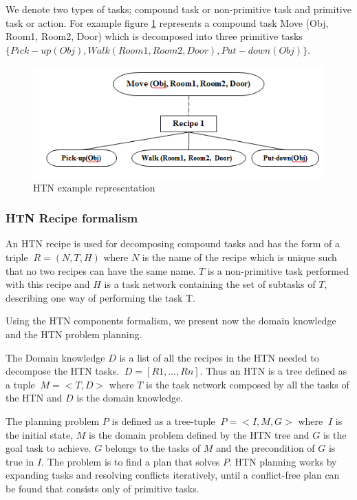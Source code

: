 We denote two types of tasks; compound task or non-primitive task and primitive task or action. For example figure \ref{HTN example representation} represents a compound task Move (Obj, Room1, Room2, Door) which is decomposed into three primitive tasks $\{Pick-up (Obj), Walk (Room1, Room2, Door), Put-down(Obj)\}$.

\begin{figure}[h]
	\centering
	\includegraphics[width=\textwidth]{Pictures/example.png}
	\caption{\label{HTN example representation} HTN example representation}
\end{figure}


\subsubsection{HTN Recipe formalism}
An HTN recipe is used for decomposing compound tasks and has the form of a triple $\ R = (N, T, H)$ where $N$ is the name of the recipe which is unique such that no two recipes can have the same name. $T$ is a non-primitive task performed with this recipe and $H$ is a task network containing the set of subtasks of $T$, describing one way of performing the task T.


Using the HTN components formalism, we present now the domain knowledge and the HTN problem planning.

\par The Domain knowledge $D$ is a list of all the recipes in the HTN needed to decompose the HTN tasks. $\ D= [R1,. . . , Rn].$ Thus an HTN is a tree defined as a tuple $\ M =<T,D> $ where $T$ is the task network composed by all the tasks of the HTN and $D$ is the domain knowledge.

\par The planning problem $P$ is defined as a tree-tuple $\ P =< I, M, G>$ where $\ I$ is the initial state, $M$ is the domain problem defined by the HTN tree and $G$ is the goal task to achieve. $G$ belongs to the tasks of $M$ and the precondition of $G$ is true in $I$. The problem is to find a plan that solves $P$. HTN planning works by expanding tasks and resolving conflicts iteratively, until a conflict-free plan can be found that consists only of primitive tasks.

